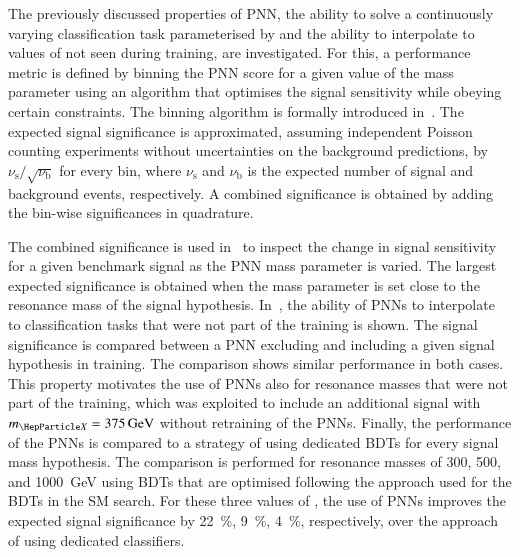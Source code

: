 The previously discussed properties of PNN, the ability to solve a continuously
varying classification task parameterised by \mX and the ability to interpolate
to values of \mX not seen during training, are investigated. For this, a
performance metric is defined by binning the PNN score for a given value of the
mass parameter using an algorithm that optimises the signal sensitivity while
obeying certain constraints. The binning algorithm is formally introduced
in~.
%
The expected signal significance is approximated, assuming independent Poisson
counting experiments without uncertainties on the background predictions,
by~$\nu_\text{s} / \sqrt{\nu_\text{b}}$ for every bin, where $\nu_\text{s}$ and
$\nu_\text{b}$ is the expected number of signal and background events,
respectively. A combined significance is obtained by adding the bin-wise
significances in quadrature.

The combined significance is used in~ to
inspect the change in signal sensitivity for a given benchmark signal
as the PNN mass parameter is varied. The largest expected significance
is obtained when the mass parameter is set close to the resonance mass
of the signal hypothesis.
In~, the ability of PNNs to interpolate to
classification tasks that were not part of the training is shown. The signal
significance is compared between a PNN excluding and including a given signal
hypothesis in training. The comparison shows similar performance in both
cases. This property motivates the use of PNNs also for resonance masses that
were not part of the training, which was exploited to include an additional
signal with $\mX = \SI{375}{\GeV}$ without retraining of the
PNNs. %
Finally, the performance of the PNNs is compared to a strategy of
using dedicated BDTs for every signal mass hypothesis. The comparison
is performed for resonance masses of \num{300}, \num{500}, and
\SI{1000}{\GeV} using BDTs that are optimised following the approach
used for the BDTs in the SM \HH search. For these three values of \mX,
the use of PNNs improves the expected signal significance by
\SI{22}{\percent}, \SI{9}{\percent}, \SI{4}{\percent}, respectively,
over the approach of using dedicated classifiers.

